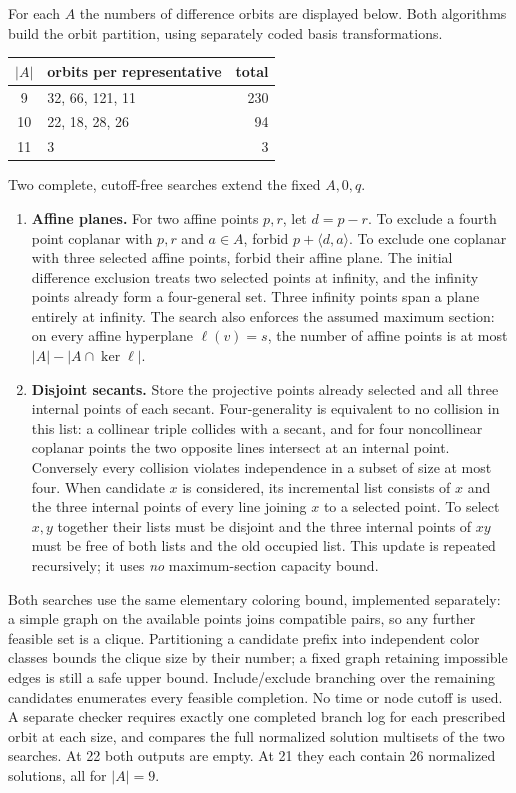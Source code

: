 \documentclass[10pt]{article}
\begin{document}
For each $A$ the numbers of difference orbits are displayed below. Both algorithms build the orbit partition, using separately coded basis transformations.
\begin{center}
\begin{tabular}{c l r}
\toprule $|A|$ & orbits per representative & total\\\midrule
9 & 32, 66, 121, 11 & 230\\
10 &22, 18, 28, 26 &94\\
11 &3&3\\\bottomrule
\end{tabular}
\end{center}
Two complete, cutoff-free searches extend the fixed $A,0,q$.
\begin{enumerate}
\item \textbf{Affine planes.} For two affine points $p,r$, let $d=p-r$. To exclude a fourth point coplanar with $p,r$ and $a\in A$, forbid $p+\langle d,a\rangle$. To exclude one coplanar with three selected affine points, forbid their affine plane. The initial difference exclusion treats two selected points at infinity, and the infinity points already form a four-general set. Three infinity points span a plane entirely at infinity. The search also enforces the assumed maximum section: on every affine hyperplane $\ell(v)=s$, the number of affine points is at most $|A|-|A\cap\ker\ell|$.
\item \textbf{Disjoint secants.} Store the projective points already selected and all three internal points of each secant. Four-generality is equivalent to no collision in this list: a collinear triple collides with a secant, and for four noncollinear coplanar points the two opposite lines intersect at an internal point. Conversely every collision violates independence in a subset of size at most four. When candidate $x$ is considered, its incremental list consists of $x$ and the three internal points of every line joining $x$ to a selected point. To select $x,y$ together their lists must be disjoint and the three internal points of $xy$ must be free of both lists and the old occupied list. This update is repeated recursively; it uses \emph{no} maximum-section capacity bound.
\end{enumerate}
Both searches use the same elementary coloring bound, implemented separately: a simple graph on the available points joins compatible pairs, so any further feasible set is a clique. Partitioning a candidate prefix into independent color classes bounds the clique size by their number; a fixed graph retaining impossible edges is still a safe upper bound. Include/exclude branching over the remaining candidates enumerates every feasible completion. No time or node cutoff is used. A separate checker requires exactly one completed branch log for each prescribed orbit at each size, and compares the full normalized solution multisets of the two searches. At 22 both outputs are empty. At 21 they each contain 26 normalized solutions, all for $|A|=9$.
\end{document}
